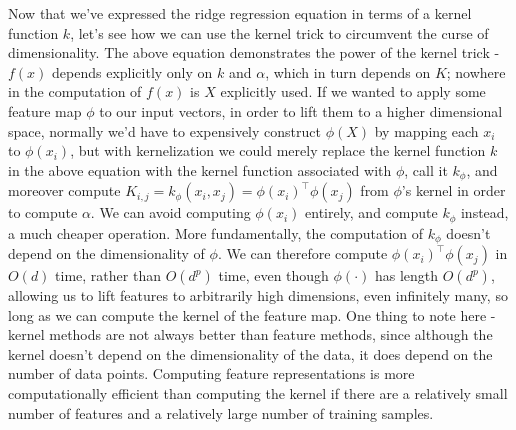 Now that we've expressed the ridge regression equation in terms of a kernel function $ k $, let's see how we can use the kernel trick to circumvent the curse of dimensionality. The above equation demonstrates the power of the kernel trick - $ f(x) $ depends explicitly only on $ k $ and $ \alpha $, which in turn depends on $ K $; nowhere in the computation of $ f(x) $ is $ X $ explicitly used. If we wanted to apply some feature map $ \phi $ to our input vectors, in order to lift them to a higher dimensional space, normally we'd have to expensively construct $ \phi(X) $ by mapping each $ x_i $ to $ \phi(x_i) $, but with kernelization we could merely replace the kernel function $ k $ in the above equation with the kernel function associated with $ \phi $, call it $ k_{\phi} $, and moreover compute $ K_{i, j} = k_{\phi}(x_i, x_j) = \phi(x_i)^\intercal \phi(x_j) $ from $ \phi $'s kernel in order to compute $ \alpha $. We can avoid computing $ \phi(x_i) $ entirely, and compute $ k_\phi $ instead, a much cheaper operation. More fundamentally, the computation of $ k_\phi $ doesn't depend on the dimensionality of $ \phi $. We can therefore compute $ \phi(x_i)^\intercal \phi(x_j) $ in $ O(d) $ time, rather than $ O(d^p) $ time, even though $ \phi(\cdot) $ has length $ O(d^p) $, allowing us to lift features to arbitrarily high dimensions, even infinitely many, so long as we can compute the kernel of the feature map. One thing to note here - kernel methods are not always better than feature methods, since although the kernel doesn't depend on the dimensionality of the data, it does depend on the number of data points. Computing feature representations is more computationally efficient than computing the kernel if there are a relatively small number of features and a relatively large number of training samples.

